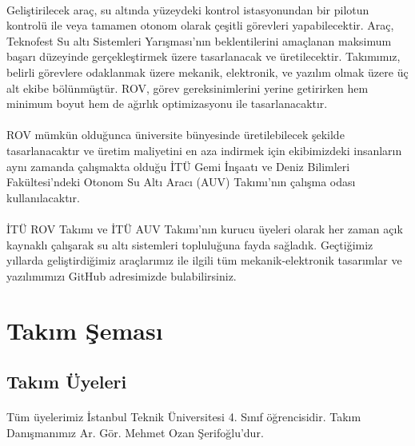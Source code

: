 \documentclass[12pt]{article}
\begin{document}
\paragraph{} Geliştirilecek araç, su altında yüzeydeki kontrol istasyonundan bir pilotun kontrolü ile veya tamamen otonom olarak çeşitli görevleri yapabilecektir. Araç, Teknofest Su altı Sistemleri Yarışması’nın beklentilerini amaçlanan maksimum başarı düzeyinde gerçekleştirmek üzere tasarlanacak ve üretilecektir. Takımımız, belirli görevlere odaklanmak üzere mekanik, elektronik, ve yazılım olmak üzere üç alt ekibe bölünmüştür. ROV, görev gereksinimlerini yerine getirirken hem minimum boyut hem de ağırlık optimizasyonu ile tasarlanacaktır.

\paragraph{} ROV mümkün olduğunca üniversite bünyesinde üretilebilecek şekilde tasarlanacaktır ve üretim maliyetini en aza indirmek için ekibimizdeki insanların aynı zamanda çalışmakta olduğu İTÜ Gemi İnşaatı ve Deniz Bilimleri Fakültesi'ndeki Otonom Su Altı Aracı (AUV) Takımı'nın çalışma odası kullanılacaktır.

\paragraph{} İTÜ ROV Takımı ve İTÜ AUV Takımı'nın kurucu üyeleri olarak her zaman açık kaynaklı çalışarak su altı sistemleri topluluğuna fayda sağladık. Geçtiğimiz yıllarda geliştirdiğimiz araçlarımız ile ilgili tüm mekanik-elektronik tasarımlar ve yazılımımızı GitHub adresimizde bulabilirsiniz.

\newpage

\section{Takım Şeması}
\subsection{Takım Üyeleri}

\paragraph{} Tüm üyelerimiz İstanbul Teknik Üniversitesi 4. Sınıf öğrencisidir. Takım Danışmanımız Ar. Gör. Mehmet Ozan Şerifoğlu'dur.
\end{document}
